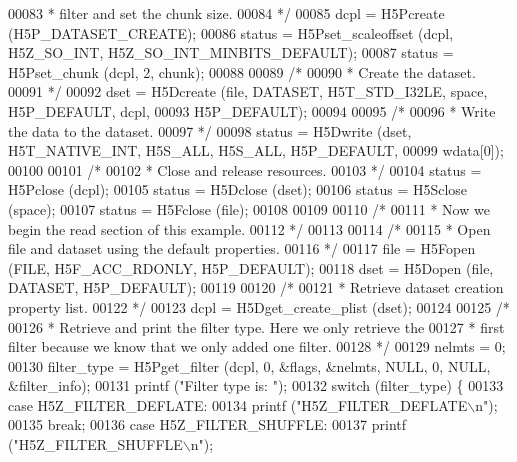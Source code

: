 \begin{DoxyCode}
00083 \textcolor{comment}{     * filter and set the chunk size.}
00084 \textcolor{comment}{     */}
00085     dcpl = H5Pcreate (H5P\_DATASET\_CREATE);
00086     status = H5Pset\_scaleoffset (dcpl, H5Z\_SO\_INT, H5Z\_SO\_INT\_MINBITS\_DEFAULT);
00087     status = H5Pset\_chunk (dcpl, 2, chunk);
00088 
00089     \textcolor{comment}{/*}
00090 \textcolor{comment}{     * Create the dataset.}
00091 \textcolor{comment}{     */}
00092     dset = H5Dcreate (file, DATASET, H5T\_STD\_I32LE, space, H5P\_DEFAULT, dcpl,
00093                 H5P\_DEFAULT);
00094 
00095     \textcolor{comment}{/*}
00096 \textcolor{comment}{     * Write the data to the dataset.}
00097 \textcolor{comment}{     */}
00098     status = H5Dwrite (dset, H5T\_NATIVE\_INT, H5S\_ALL, H5S\_ALL, H5P\_DEFAULT,
00099                 wdata[0]);
00100 
00101     \textcolor{comment}{/*}
00102 \textcolor{comment}{     * Close and release resources.}
00103 \textcolor{comment}{     */}
00104     status = H5Pclose (dcpl);
00105     status = H5Dclose (dset);
00106     status = H5Sclose (space);
00107     status = H5Fclose (file);
00108 
00109 
00110     \textcolor{comment}{/*}
00111 \textcolor{comment}{     * Now we begin the read section of this example.}
00112 \textcolor{comment}{     */}
00113 
00114     \textcolor{comment}{/*}
00115 \textcolor{comment}{     * Open file and dataset using the default properties.}
00116 \textcolor{comment}{     */}
00117     file = H5Fopen (FILE, H5F\_ACC\_RDONLY, H5P\_DEFAULT);
00118     dset = H5Dopen (file, DATASET, H5P\_DEFAULT);
00119 
00120     \textcolor{comment}{/*}
00121 \textcolor{comment}{     * Retrieve dataset creation property list.}
00122 \textcolor{comment}{     */}
00123     dcpl = H5Dget\_create\_plist (dset);
00124 
00125     \textcolor{comment}{/*}
00126 \textcolor{comment}{     * Retrieve and print the filter type.  Here we only retrieve the}
00127 \textcolor{comment}{     * first filter because we know that we only added one filter.}
00128 \textcolor{comment}{     */}
00129     nelmts = 0;
00130     filter\_type = H5Pget\_filter (dcpl, 0, &flags, &nelmts, NULL, 0, NULL, &filter\_info);
00131     printf (\textcolor{stringliteral}{"Filter type is: "});
00132     \textcolor{keywordflow}{switch} (filter\_type) \{
00133         \textcolor{keywordflow}{case} H5Z\_FILTER\_DEFLATE:
00134             printf (\textcolor{stringliteral}{"H5Z\_FILTER\_DEFLATE\(\backslash\)n"});
00135             \textcolor{keywordflow}{break};
00136         \textcolor{keywordflow}{case} H5Z\_FILTER\_SHUFFLE:
00137             printf (\textcolor{stringliteral}{"H5Z\_FILTER\_SHUFFLE\(\backslash\)n"});

\end{DoxyCode}

